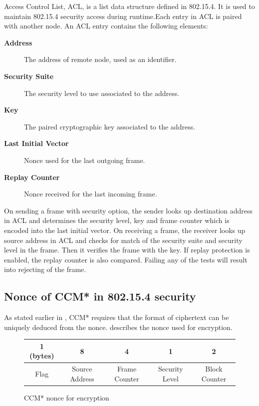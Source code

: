 Access Control List, ACL, is a list data structure defined in 802.15.4. It is used to maintain 802.15.4 security access during runtime.Each entry in ACL is paired with another node.  An ACL entry contains the following elements:
\begin{description}
	\item[\textbf{Address}] The address of remote node, used as an identifier.
	\item[\textbf{Security Suite}] The security level to use associated to the address.
	\item[\textbf{Key}] The paired cryptographic key associated to the address.
	\item[\textbf{Last Initial Vector}] Nonce used for the last outgoing frame.
	\item[\textbf{Replay Counter}] Nonce received for the last incoming frame.
\end{description}
On sending a frame with security option, the sender looks up destination address in ACL and determines the security level, key and frame counter which is encoded into the last initial vector. On receiving a frame, the receiver looks up source address in ACL and checks for match of the security suite and security level in the frame. Then it verifies the frame with the key. If replay protection is enabled, the replay counter is also compared. Failing any of the tests will result into rejecting of the frame.

\subsection{Nonce of CCM* in 802.15.4 security}
As stated earlier in , CCM* requires that the format of ciphertext can be uniquely deduced from the nonce.  describes the nonce used for encryption.

\begin{figure}[h!]
	\centering
	\begin{tabular}{|c|c|c|c|c|}
		\hline 
		1 (bytes) & 8              & 4             & 1              & 2             \\ \hline
		Flag      & Source Address & Frame Counter & Security Level & Block Counter \\ \hline
	\end{tabular}
	\caption{CCM* nonce for encryption}
	\label{Fig: CCM nonce}
\end{figure}

